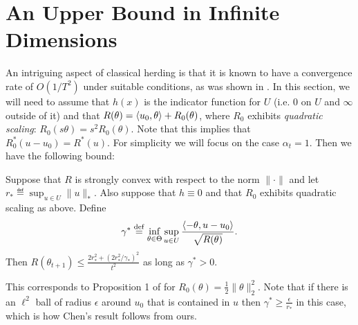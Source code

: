 \documentclass[paper.tex]{subfiles}
\begin{document}
\section{An Upper Bound in Infinite Dimensions}
\label{sec:chen-proofs}

An intriguing aspect of classical herding is that it is known to have a convergence rate of 
$O(1/T^2)$ under suitable conditions, as was shown in \citet{Chen:2010a}. In this section, 
we will need to assume that $h(x)$ is the indicator function for $U$ (i.e. $0$ on $U$ and 
$\infty$ outside of it) and that $R(\theta) = \left\langle u_0, \theta \right\rangle + R_0(\theta)$, where 
$R_0$ exhibits \emph{quadratic scaling}: $R_0(s\theta) = s^2R_0(\theta)$. Note that 
this implies that $R_0^*(u-u_0) = R^*(u)$.
For simplicity 
we will focus on the case $\alpha_t = 1$. Then we have 
the following bound:
\begin{theorem}
\label{thm:chen}
Suppose that $R$ is strongly convex with respect to the norm $\|\cdot\|$ and 
let $r_* \eqdef \sup_{u \in U} \|u\|_*$. Also suppose that $h \equiv 0$ and 
that $R_0$ exhibits quadratic scaling as above. Define 
\[ \gamma^* \stackrel{\mathrm{def}}{=} \inf_{\theta \in \Theta} \sup_{u \in U} \frac{\left\langle -\theta, u-u_0 \right\rangle}{\sqrt{R(\theta)}}. \]
Then $R(\theta_{t+1}) \leq \frac{2r_*^2+(2r_*^2/\gamma_*)^2}{t^2}$ as long 
as $\gamma^* > 0$.
\end{theorem}
This corresponds to Proposition 1 of \citet{Chen:2010b} for $R_{0}(\theta) = \frac{1}{2}\|\theta\|_2^2$. Note that if there is an $\ell^2$ ball of radius $\epsilon$ 
around $u_0$ that is contained in $u$ then $\gamma^* \geq \frac{\epsilon}{r_*}$ 
in this case, which is how Chen's result follows from ours.
\end{document}
